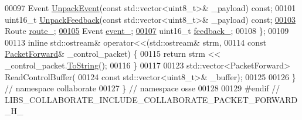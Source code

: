 \begin{DoxyCode}
00097   Event \hyperlink{classosse_1_1collaborate_1_1_packet_forward_a954b32499a8ca1e5d68da03b567dc2e3}{UnpackEvent}(\textcolor{keyword}{const} std::vector<uint8\_t>& \_payload) \textcolor{keyword}{const};
00101   uint16\_t \hyperlink{classosse_1_1collaborate_1_1_packet_forward_a4498a5e0e0c38145f88238df36ad815d}{UnpackFeedback}(\textcolor{keyword}{const} std::vector<uint8\_t>& \_payload) \textcolor{keyword}{const};
\hyperlink{classosse_1_1collaborate_1_1_packet_forward_a6e1aebd75f31a98f1effe8011480607d}{00103}   Route \hyperlink{classosse_1_1collaborate_1_1_packet_forward_a6e1aebd75f31a98f1effe8011480607d}{route\_};
\hyperlink{classosse_1_1collaborate_1_1_packet_forward_ada88ba82c98c358b3c5200300d322f9e}{00105}   Event \hyperlink{classosse_1_1collaborate_1_1_packet_forward_ada88ba82c98c358b3c5200300d322f9e}{event\_};
\hyperlink{classosse_1_1collaborate_1_1_packet_forward_a93607aa047ad213bc9938374dcbe1e64}{00107}   uint16\_t \hyperlink{classosse_1_1collaborate_1_1_packet_forward_a93607aa047ad213bc9938374dcbe1e64}{feedback\_};
00108 \};
00109 
00113 \textcolor{keyword}{inline} std::ostream& operator<<(std::ostream& strm,
00114                                 \textcolor{keyword}{const} \hyperlink{classosse_1_1collaborate_1_1_packet_forward}{PacketForward}& \_control\_packet) \{
00115   \textcolor{keywordflow}{return} strm << \_control\_packet.\hyperlink{classosse_1_1collaborate_1_1_packet_forward_ab1bc40a24079aac6e1ee579e76b6e4a3}{ToString}();
00116 \}
00117 
00123 std::vector<PacketForward> ReadControlBuffer(
00124     \textcolor{keyword}{const} std::vector<uint8\_t>& \_buffer);
00125 
00126 \}  \textcolor{comment}{// namespace collaborate}
00127 \}  \textcolor{comment}{// namespace osse}
00128 
00129 \textcolor{preprocessor}{#endif  // LIBS\_COLLABORATE\_INCLUDE\_COLLABORATE\_PACKET\_FORWARD\_H\_}
\end{DoxyCode}
